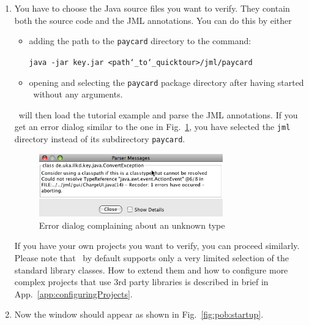 \begin{enumerate}
\item You have to choose the Java source files you want to
  verify. They contain both the source code and the JML
  annotations. You can do this by either
\begin{itemize}
  \item adding the path to the \texttt{paycard}
    directory to the command:
    \begin{center}
      \texttt{java -jar key.jar <path\char`\_to\char`\_quicktour>/jml/paycard}  
    \end{center}
  \item opening  and selecting the \texttt{paycard}
    package directory after having started \KeY\ without
    any arguments.
\end{itemize}

\KeY\ will then load the tutorial example and parse the JML
annotations. If you get an error dialog similar to the one in
  Fig.~\ref{fig:error:unknownType}, you have selected the
  \texttt{jml} directory instead of its subdirectory \texttt{paycard}.

\begin{figure}
\centering
\includegraphics[width=0.75\textwidth]{../figures/errorDialogUnknownType}
\caption{Error dialog complaining about an unknown type}
\label{fig:error:unknownType}
\end{figure}

If you have your own projects you want to verify, you can proceed
similarly. Please note that \KeY\ by default supports only a very
limited selection of the standard library classes.
How to extend them and how to
configure more complex projects that use 3rd party libraries is
described in brief in App.~\ref{app:configuringProjects}.

\item Now the \prm{} window should appear as shown in
  Fig.~\ref{fig:pob:startup}.
  

\end{enumerate}
